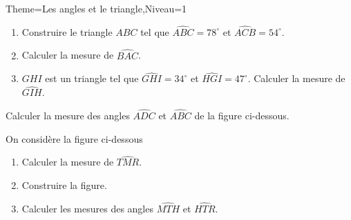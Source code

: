 \documentclass[a4paper,12pt]{article}
\begin{document}
\begin{Maquette}[Fiche]{Theme=Les angles et le triangle,Niveau=1}

\begin{exercice}
\begin{enumerate}
\item Construire le triangle $ABC$ tel que $\widehat{ABC}=78^{\circ}$ et $\widehat{ACB}=54^{\circ}$.
\item Calculer la mesure de $\widehat{BAC}$.
\item $GHI$ est un triangle tel que $\widehat{GHI}=34^{\circ}$ et $\widehat{HGI}=47^{\circ}$. Calculer la mesure de $\widehat{GIH}$.
\end{enumerate}
\end{exercice}

\begin{exercice}
\begin{minipage}{.5\linewidth}
Calculer la mesure des angles $\widehat{ADC}$ et $\widehat{ABC}$ de la figure ci-dessous.
\end{minipage}%
\begin{minipage}{.5\linewidth}
\end{minipage}
\end{exercice}

\begin{exercice}
\begin{minipage}{.6\linewidth}
On considère la figure ci-dessous
\begin{enumerate}
\item Calculer la mesure de $\widehat{TMR}$.
\item Construire la figure.
\item Calculer les mesures des angles $\widehat{MTH}$ et $\widehat{HTR}$.
\end{enumerate}
\end{minipage}%
\begin{minipage}{.4\linewidth}
\end{minipage}
\end{exercice}


\end{Maquette}
\end{document}
